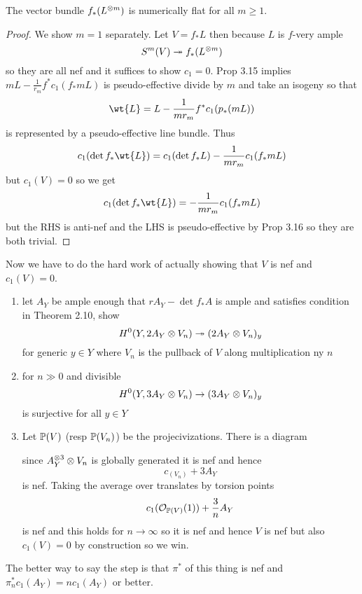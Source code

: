 \documentclass[12pt]{article}
\begin{document}
\begin{lemma}
The vector bundle $f_* (L^{\ot m})$ is numerically flat for all $m \ge 1$.
\end{lemma}

\begin{proof}
We show $m = 1$ separately. Let $V = f_* L$ then because $L$ is $f$-very ample
\[ S^m(V) \onto f_* (L^{\ot m}) \]
so they are all nef and it suffices to show $c_1 = 0$. Prop 3.15 implies $m L - \frac{1}{r_m} f^* c_1(f_* mL)$ is pseudo-effective divide by $m$ and take an isogeny so that 
\[ \wt{L} = L - \frac{1}{m r_m} f^* c_1(p_*(mL)) \]
is represented by a pseudo-effective line bundle. Thus
\[ c_1(\det{f_* \wt{L}}) = c_1(\det{f_* L}) - \frac{1}{m r_m} c_1(f_* mL) \]
but $c_1(V) = 0$ so we get
\[  c_1(\det{f_* \wt{L}}) = - \frac{1}{m r_m} c_1(f_* mL) \]
but the RHS is anti-nef and the LHS is pseudo-effective by Prop 3.16 so they are both trivial.
\end{proof}

Now we have to do the hard work of actually showing that $V$ is nef and $c_1(V) = 0$. 

\begin{enumerate}
\item let $A_Y$ be ample enough that $r A_Y - \det{f_* A}$ is ample and satisfies condition in Theorem 2.10, show
\[ H^0(Y, 2 A_Y \ot V_n) \onto (2A_Y \ot V_n)_y \]
for generic $y \in Y$ where $V_n$ is the pullback of $V$ along multiplication ny $n$

\item for $n \gg 0$ and divisible
\[ H^0(Y, 3 A_Y \ot V_n) \to (3 A_Y \ot V_n)_y \]
is surjective for all $y \in Y$

\item Let $\P(V)$ (resp $\P(V_n)$) be the projecivizations. There is a diagram
\begin{center}
\end{center}
since $A_Y^{\ot 3} \ot V_n$ is globally generated it is nef and hence
\[ c_(V_n) + 3 A_Y \]
is nef. Taking the average over translates by torsion points 
\[ c_1(\struct{\P(V)}(1)) + \frac{3}{n} A_Y \]
is nef and this holds for $n \to \infty$ so it is nef and hence $V$ is nef but also $c_1(V) = 0$ by construction so we win.
\end{enumerate}
The better way to say the step is that $\pi^*$ of this thing is nef and $\pi_n^* c_1(A_Y) = n c_1(A_Y)$ or better.
\end{document}
